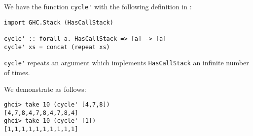 
We have the function \verb|cycle'| with the following 
definition in :
\scriptsize\begin{verbatim}
import GHC.Stack (HasCallStack)

cycle' :: forall a. HasCallStack => [a] -> [a]
cycle' xs = concat (repeat xs)
\end{verbatim}\normalsize
\verb|cycle'| repeats an argument which implements \verb|HasCallStack| an
infinite number of times.\par
\qquad We demonstrate as follows:
\scriptsize\begin{verbatim}
ghci> take 10 (cycle' [4,7,8])
[4,7,8,4,7,8,4,7,8,4]
ghci> take 10 (cycle' [1])
[1,1,1,1,1,1,1,1,1,1]
\end{verbatim}\normalsize
